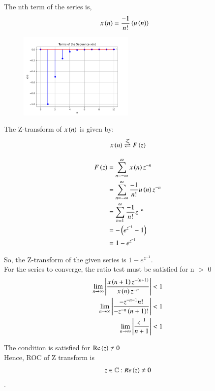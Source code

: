 \documentclass[journal,12pt,twocolumn]{IEEEtran}
\begin{document}
The nth term of the series is,
\begin{align*}
    x \left(n\right) & = \frac{-1}{n!}  \left(u \left(n\right)\right)
\end{align*}

\begin{figure}
  \centering
  \includegraphics[width=0.5\textwidth]{plot.png}
\end{figure}

The Z-transform of $ x \left(n\right) $ is given by:
$$x \left(n\right) \overset{\mathcal{Z}}{ \rightleftharpoons} F \left(z\right)$$

\begin{align*}
    F \left(z\right) & = \sum_{n=-\infty}^{\infty} x \left(n\right)   z^{-n} \\
    & = \sum_{n=-\infty}^{\infty} \frac{-1}{n!}  u \left(n\right)   z^{-n} \\
    & = \sum_{n=1}^{\infty} \frac{-1}{n!}   z^{-n} \\
    & = -  \left(e^{z^{-1}} - 1\right) \\
    & = 1 - e^{z^{-1}}
\end{align*}

So, the Z-transform of the given series is
$ 1 - e^{z^{-1}} $.\\


For the series to converge, the ratio test must be satisfied for n $>$ 0
\begin{align*}
 \lim_{{n \to \infty}}  \left| \frac{x \left(n+1\right) z^{- \left(n+1\right)}}{x \left(n\right) z^{-n}}  \right| & <  1 \\
\lim_{{n \to \infty}}  \left| \frac{-z^{-n-1} n!}{-z^{-n}  \left(n+1\right)!} \right| & < 1\\
\lim_{{n \to \infty}}  \left| \frac{z^{-1}}{n+1}  \right| & < 1\\
\end{align*}

The condition is satisfied for $ \text{Re} \left(z\right) \neq 0 $ \\

Hence, ROC of Z transform is $$z\in\mathbb{C} : Re \left(z\right) \neq 0$$.
\end{document}
